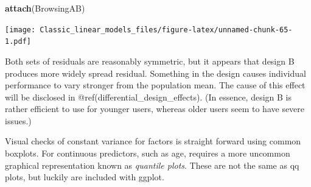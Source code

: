 \documentclass[]{svmono}
\newenvironment{Shaded}{\begin{snugshade}}{\end{snugshade}}
\newcommand{\KeywordTok}[1]{\textcolor[rgb]{0.13,0.29,0.53}{\textbf{#1}}}
\newcommand{\DataTypeTok}[1]{\textcolor[rgb]{0.13,0.29,0.53}{#1}}
\newcommand{\StringTok}[1]{\textcolor[rgb]{0.31,0.60,0.02}{#1}}
\newcommand{\OperatorTok}[1]{\textcolor[rgb]{0.81,0.36,0.00}{\textbf{#1}}}
\newcommand{\NormalTok}[1]{#1}
\theoremstyle{definition}
\theoremstyle{definition}
\theoremstyle{definition}
\theoremstyle{remark}
\begin{document}
\begin{Shaded}
\begin{Highlighting}[]
\KeywordTok{attach}\NormalTok{(BrowsingAB)}
\end{Highlighting}
\end{Shaded}

\begin{Shaded}
\end{Shaded}

\texttt{[image: Classic\_linear\_models\_files/figure-latex/unnamed-chunk-65-1.pdf]}

Both sets of residuals are reasonably symmetric, but it appears that
design B produces more widely spread residual. Something in the design
causes individual performance to vary stronger from the population mean.
The cause of this effect will be disclosed in
@ref(differential\_design\_effects). (In essence, design B is rather
efficient to use for younger users, whereas older users seem to have
severe issues.)

Visual checks of constant variance for factors is straight forward using
common boxplots. For continuous predictors, such as age, requires a more
uncommon graphical representation known as \emph{quantile plots}. These
are not the same as qq plots, but luckily are included with ggplot.

\begin{Shaded}
\end{Shaded}
\end{document}
